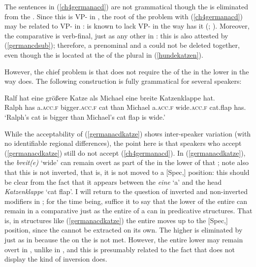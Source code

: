 The sentences in (\ref{ch4germanacd}) are not grammatical though the  is eliminated from the . Since this  is VP- in , the root of the problem with (\ref{ch4germanacd}) may be related to VP- in :  is known to lack VP- in the way  has it (\citealt[120--124]{winkler2005}; \citealt[671]{merchant2004}). Moreover, the  comparative  is verb-final, just as any other  in : this is also attested by (\ref{germancdsub}); therefore, a prenominal  and a  could not be deleted together, even though the  is located at the  of the plural  in (\ref{hundekatzen}).

However, the chief problem is that  does not require the  of the  in the lower  in the way  does. The following construction is fully grammatical for several speakers:

\ea \gll	Ralf	hat	eine	größere	Katze	als Michael	eine breite Katzenklappe hat. \label{germanacdkatze}\\
Ralph	has	a.\textsc{acc.f} bigger.\textsc{acc.f} cat than Michael a.\textsc{acc.f} wide.\textsc{acc.f} cat.flap has.\\
\glt `Ralph's cat is bigger than Michael's cat flap is wide.'
\z

While the acceptability of (\ref{germanacdkatze}) shows inter-speaker variation (with no identifiable regional differences), the point here is that speakers who accept (\ref{germanacdkatze}) still do not accept (\ref{ch4germanacd}). In (\ref{germanacdkatze}), the  \textit{breit(e)} `wide' can remain overt as part of the  in the lower  of that ; note also that this  is not inverted, that is, it is not moved to a [Spec,] position: this should be clear from the fact that it appears between the  \textit{eine} `a' and the  head \textit{Katzenklappe} `cat flap'. I will return to the question of inverted and non-inverted  modifiers in ; for the time being, suffice it to say that the lower  of the entire  can remain in a  comparative  just as the entire  of a  can in predicative structures. That is, in structures like (\ref{germanacdkatze}) the entire  moves up to the [Spec,] position, since the  cannot be extracted on its own. The higher  is eliminated by  just as in  because the  on the  is not met. However, the entire lower  may remain overt in , unlike in , and this is presumably related to the fact that  does not display the kind of inversion  does.

